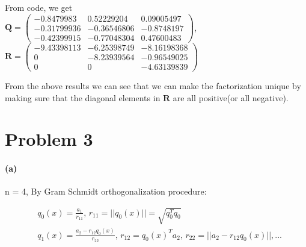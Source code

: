 \documentclass[12pt, letterpaper]{article}
\begin{document}
 \vspace{5mm}
 From code, we get\\
 \vspace{5mm}
 $\mathbf{Q} = \begin{pmatrix} 
-0.8479983  & 0.52229204 & 0.09005497 \\
-0.31799936  & -0.36546806 & -0.8748197 \\
-0.42399915  & -0.77048304 & 0.47600483
 \end{pmatrix}$,\\
 $\mathbf{R} = \begin{pmatrix} 
-9.43398113  & -6.25398749 & -8.16198368 \\
0       & -8.23939564 & -0.96549025 \\
0       & 0 & -4.63139839
 \end{pmatrix}$


 From the above results we can see that we can make the factorization unique by making sure that the diagonal elements in $\mathbf{R}$ are all positive(or all negative).


\pagebreak
\section*{Problem 3}
\label{sec:prob3}

\paragraph{(a)} n = 4, By Gram Schmidt orthogonalization procedure:

\begin{align*}
  &q_0(x) = \frac{a_1}{r_{11}}, \, r_{11} = ||q_0(x)|| = \sqrt{q_0^Tq_0}\\
  &q_1(x) = \frac{a_2 - r_{12}q_0(x)}{r_{22}}, \, r_{12} = q_0(x)^Ta_2, \, r_{22} = ||a_2 - r_{12}q_0(x)||, ...
\end{align*}

\hline
\end{document}
